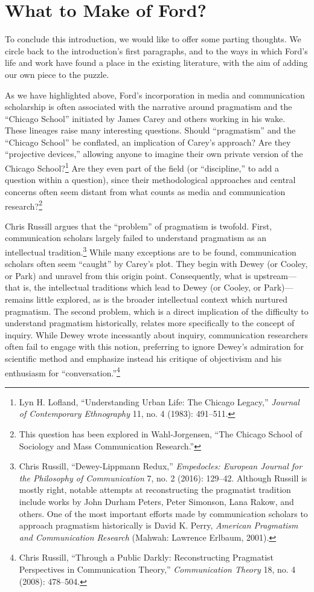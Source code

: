 \documentclass[twoside,symmetric,nobib,justified]{tufte-book}
\begin{document}
\hypertarget{what-to-make-of-ford}{%
\section{What to Make of Ford?}\label{what-to-make-of-ford}}

To conclude this introduction, we would like to offer some parting
thoughts. We circle back to the introduction's first paragraphs, and to
the ways in which Ford's life and work have found a place in the
existing literature, with the aim of adding our own piece to the puzzle.

As we have highlighted above, Ford's incorporation in media and
communication scholarship is often associated with the narrative around
pragmatism and the ``Chicago School'' initiated by James Carey and
others working in his wake. These lineages raise many interesting
questions. Should ``pragmatism'' and the ``Chicago School'' be
conflated, an implication of Carey's approach? Are they ``projective
devices,'' allowing anyone to imagine their own private version of the
Chicago School?\footnote{Lyn H. Lofland, ``Understanding Urban Life: The
  Chicago Legacy,'' \emph{Journal of Contemporary Ethnography} 11, no. 4
  (1983): 491--511.} Are they even part of the field (or ``discipline,''
to add a question within a question), since their methodological
approaches and central concerns often seem distant from what counts as
media and communication research?\footnote{This question has been
  explored in Wahl-Jorgensen, ``The Chicago School of Sociology and Mass
  Communication Research.''}

Chris Russill argues that the ``problem'' of pragmatism is twofold.
First, communication scholars largely failed to understand pragmatism as
an intellectual tradition.\footnote{Chris Russill, ``Dewey-Lippmann
  Redux,'' \emph{Empedocles: European Journal for the Philosophy of
  Communication} 7, no. 2 (2016): 129--42. Although Russill is mostly
  right, notable attempts at reconstructing the pragmatist tradition
  include works by John Durham Peters, Peter Simonson, Lana Rakow, and
  others. One of the most important efforts made by communication
  scholars to approach pragmatism historically is David K. Perry,
  \emph{American Pragmatism and Communication Research} (Mahwah:
  Lawrence Erlbaum, 2001).} While many exceptions are to be found,
communication scholars often seem ``caught'' by Carey's plot. They begin
with Dewey (or Cooley, or Park) and unravel from this origin point.
Consequently, what is upstream---that is, the intellectual traditions
which lead to Dewey (or Cooley, or Park)---remains little explored, as
is the broader intellectual context which nurtured pragmatism. The
second problem, which is a direct implication of the difficulty to
understand pragmatism historically, relates more specifically to the
concept of inquiry. While Dewey wrote incessantly about inquiry,
communication researchers often fail to engage with this notion,
preferring to ignore Dewey's admiration for scientific method and
emphasize instead his critique of objectivism and his enthusiasm for
``conversation.''\footnote{Chris Russill, ``Through a Public Darkly:
  Reconstructing Pragmatist Perspectives in Communication Theory,''
  \emph{Communication Theory} 18, no. 4 (2008): 478--504.}
\end{document}

